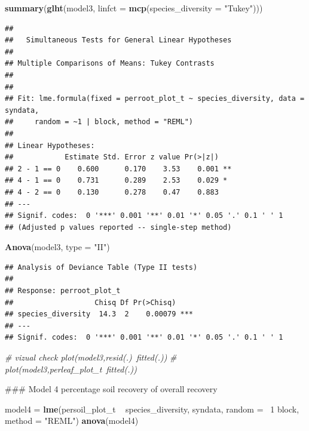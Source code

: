 \documentclass[]{article}
\newenvironment{Shaded}{}{}
\newcommand{\KeywordTok}[1]{\textcolor[rgb]{0.00,0.44,0.13}{\textbf{{#1}}}}
\newcommand{\DataTypeTok}[1]{\textcolor[rgb]{0.56,0.13,0.00}{{#1}}}
\newcommand{\DecValTok}[1]{\textcolor[rgb]{0.25,0.63,0.44}{{#1}}}
\newcommand{\StringTok}[1]{\textcolor[rgb]{0.25,0.44,0.63}{{#1}}}
\newcommand{\CommentTok}[1]{\textcolor[rgb]{0.38,0.63,0.69}{\textit{{#1}}}}
\newcommand{\NormalTok}[1]{{#1}}
\begin{document}
\begin{Shaded}
\begin{Highlighting}[]
\KeywordTok{summary}\NormalTok{(}\KeywordTok{glht}\NormalTok{(model3, }\DataTypeTok{linfct =} \KeywordTok{mcp}\NormalTok{(}\DataTypeTok{species_diversity =} \StringTok{"Tukey"}\NormalTok{)))}
\end{Highlighting}
\end{Shaded}

\begin{verbatim}
## 
##   Simultaneous Tests for General Linear Hypotheses
## 
## Multiple Comparisons of Means: Tukey Contrasts
## 
## 
## Fit: lme.formula(fixed = perroot_plot_t ~ species_diversity, data = syndata, 
##     random = ~1 | block, method = "REML")
## 
## Linear Hypotheses:
##            Estimate Std. Error z value Pr(>|z|)   
## 2 - 1 == 0    0.600      0.170    3.53    0.001 **
## 4 - 1 == 0    0.731      0.289    2.53    0.029 * 
## 4 - 2 == 0    0.130      0.278    0.47    0.883   
## ---
## Signif. codes:  0 '***' 0.001 '**' 0.01 '*' 0.05 '.' 0.1 ' ' 1
## (Adjusted p values reported -- single-step method)
\end{verbatim}

\begin{Shaded}
\begin{Highlighting}[]
\KeywordTok{Anova}\NormalTok{(model3, }\DataTypeTok{type =} \StringTok{"II"}\NormalTok{)}
\end{Highlighting}
\end{Shaded}

\begin{verbatim}
## Analysis of Deviance Table (Type II tests)
## 
## Response: perroot_plot_t
##                   Chisq Df Pr(>Chisq)    
## species_diversity  14.3  2    0.00079 ***
## ---
## Signif. codes:  0 '***' 0.001 '**' 0.01 '*' 0.05 '.' 0.1 ' ' 1
\end{verbatim}

\begin{Shaded}
\begin{Highlighting}[]

\CommentTok{# vizual check plot(model3,resid(.)~fitted(.))}
\CommentTok{# plot(model3,perleaf_plot_t~fitted(.))}


\NormalTok{### Model 4 percentage soil recovery of overall recovery}

\NormalTok{model4 = }\KeywordTok{lme}\NormalTok{(persoil_plot_t ~ species_diversity, syndata, }\DataTypeTok{random =} \NormalTok{~}\DecValTok{1} \NormalTok{\textbar{} block, }
    \DataTypeTok{method =} \StringTok{"REML"}\NormalTok{)}
\KeywordTok{anova}\NormalTok{(model4)}
\end{Highlighting}
\end{Shaded}
\end{document}
